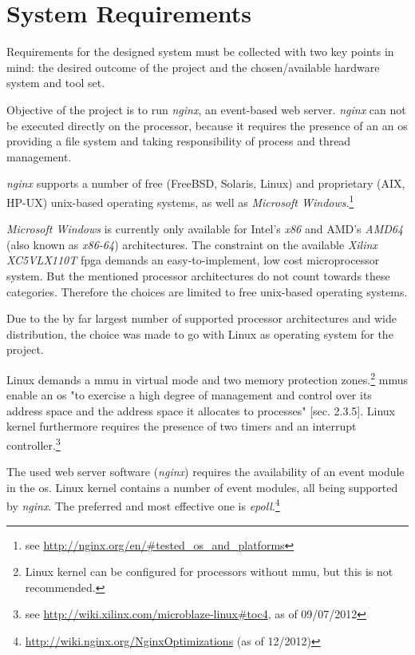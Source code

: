 \chapter{System Requirements}

Requirements for the designed system must be collected with two key points in mind: the desired outcome of the project and the chosen/available hardware system and tool set.

Objective of the project is to run \textit{nginx}, an event-based web server. \textit{nginx} can not be executed directly on the processor, because it requires the presence of an an \gls{os} providing a file system and taking responsibility of process and thread management. 

\textit{nginx} supports a number of free (FreeBSD, Solaris, Linux) and proprietary (AIX, HP-UX) unix-based operating systems, as well as \textit{Microsoft Windows}.\footnote{see \url{http://nginx.org/en/\#tested_os_and_platforms}}

\textit{Microsoft Windows} is currently only available for Intel's \textit{x86} and AMD's \textit{AMD64} (also known as \textit{x86-64}) architectures. The constraint on the available \textit{Xilinx XC5VLX110T} \gls{fpga} demands an easy-to-implement, low cost microprocessor system. But the mentioned processor architectures do not count towards these categories. Therefore the choices are limited to free unix-based operating systems.

Due to the by far largest number of supported processor architectures and wide distribution, the choice was made to go with Linux as operating system for the project.

Linux demands a \gls{mmu} in virtual mode and two memory protection zones.\footnote{Linux kernel can be configured for processors without \gls{mmu}, but this is not recommended.} \gls{mmu}s enable an \gls{os} "to exercise a high degree of
management and control over its address space and the address space it allocates to processes" \cite{linuxPrimer}[sec. 2.3.5]. Linux kernel furthermore requires the presence of two timers and an interrupt controller.\footnote{see \url{http://wiki.xilinx.com/microblaze-linux\#toc4}, as of 09/07/2012}

The used web server software (\textit{nginx}) requires the availability of an event module in the \gls{os}. Linux kernel contains a number of event modules, all being supported by \textit{nginx}. The preferred and most effective one is \textit{epoll}.\footnote{\url{http://wiki.nginx.org/NginxOptimizations} (as of 12/2012)}
